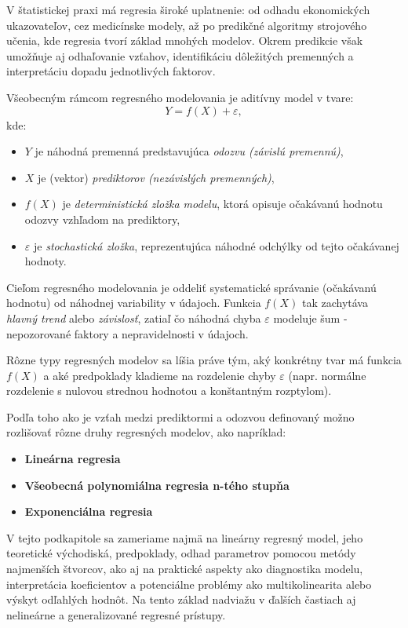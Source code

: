 V štatistickej praxi má regresia široké uplatnenie: od odhadu ekonomických ukazovateľov, cez medicínske modely, až po predikčné algoritmy strojového učenia, kde regresia tvorí základ mnohých modelov. Okrem predikcie však umožňuje aj odhaľovanie vzťahov, identifikáciu dôležitých premenných a interpretáciu dopadu jednotlivých faktorov.

Všeobecným rámcom regresného modelovania je aditívny model v tvare:
\begin{equation}
Y = f(X) + \varepsilon,
\end{equation}
kde:
\begin{itemize}
  \item $Y$ je náhodná premenná predstavujúca \textit{odozvu (závislú premennú)},
  \item $X$ je (vektor) \textit{prediktorov (nezávislých premenných)},
  \item $f(X)$ je \textit{deterministická zložka modelu}, ktorá opisuje očakávanú hodnotu odozvy vzhľadom na prediktory,
  \item $\varepsilon$ je \textit{stochastická zložka}, reprezentujúca náhodné odchýlky od tejto očakávanej hodnoty.
\end{itemize}

Cieľom regresného modelovania je oddeliť systematické správanie (očakávanú hodnotu) od náhodnej variability v údajoch. Funkcia $f(X)$ tak zachytáva \textit{hlavný trend} alebo \textit{závislosť}, zatiaľ čo náhodná chyba $\varepsilon$ modeluje šum - nepozorované faktory a nepravidelnosti v údajoch.

Rôzne typy regresných modelov sa líšia práve tým, aký konkrétny tvar má funkcia $f(X)$ a aké predpoklady kladieme na rozdelenie chyby $\varepsilon$ (napr. normálne rozdelenie s nulovou strednou hodnotou a konštantným rozptylom).

Podľa toho ako je vzťah medzi prediktormi a odozvou definovaný možno rozlišovať rôzne druhy regresných modelov, ako napríklad:
\begin{itemize}
  \item \textbf{Lineárna regresia}
  \item \textbf{Všeobecná polynomiálna regresia n-tého stupňa}
  \item \textbf{Exponenciálna regresia}
\end{itemize}

V tejto podkapitole sa zameriame najmä na lineárny regresný model, jeho teoretické východiská, predpoklady, odhad parametrov pomocou metódy najmenších štvorcov, ako aj na praktické aspekty ako diagnostika modelu, interpretácia koeficientov a potenciálne problémy ako multikolinearita alebo výskyt odľahlých hodnôt. Na tento základ nadviažu v ďalších častiach aj nelineárne a generalizované regresné prístupy.

